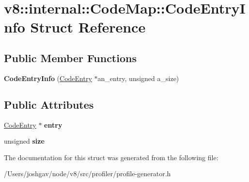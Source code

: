 \hypertarget{structv8_1_1internal_1_1_code_map_1_1_code_entry_info}{}\section{v8\+:\+:internal\+:\+:Code\+Map\+:\+:Code\+Entry\+Info Struct Reference}
\label{structv8_1_1internal_1_1_code_map_1_1_code_entry_info}
\subsection*{Public Member Functions}
\begin{DoxyCompactItemize}
\item 
{\bfseries Code\+Entry\+Info} (\hyperlink{classv8_1_1internal_1_1_code_entry}{Code\+Entry} $\ast$an\+\_\+entry, unsigned a\+\_\+size)\hypertarget{structv8_1_1internal_1_1_code_map_1_1_code_entry_info_abdab34b277643a2a51e64ddae325d474}{}\label{structv8_1_1internal_1_1_code_map_1_1_code_entry_info_abdab34b277643a2a51e64ddae325d474}

\end{DoxyCompactItemize}
\subsection*{Public Attributes}
\begin{DoxyCompactItemize}
\item 
\hyperlink{classv8_1_1internal_1_1_code_entry}{Code\+Entry} $\ast$ {\bfseries entry}\hypertarget{structv8_1_1internal_1_1_code_map_1_1_code_entry_info_af671540ae379b29dab9901d717c034f0}{}\label{structv8_1_1internal_1_1_code_map_1_1_code_entry_info_af671540ae379b29dab9901d717c034f0}

\item 
unsigned {\bfseries size}\hypertarget{structv8_1_1internal_1_1_code_map_1_1_code_entry_info_ad6d41d2dcc862c6a6351a474addce352}{}\label{structv8_1_1internal_1_1_code_map_1_1_code_entry_info_ad6d41d2dcc862c6a6351a474addce352}

\end{DoxyCompactItemize}


The documentation for this struct was generated from the following file\+:\begin{DoxyCompactItemize}
\item 
/\+Users/joshgav/node/v8/src/profiler/profile-\/generator.\+h\end{DoxyCompactItemize}

